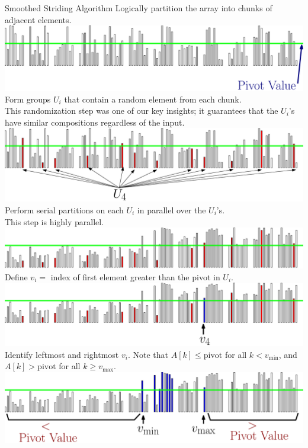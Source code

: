 \documentclass[table,serif,mathserif,final]{beamer}
\theoremstyle{remark}
\begin{document}
\begin{frame}{}
\begin{columns}[t]
  \begin{column}{0.5\linewidth}
\begin{block}{\Huge Smoothed Striding Algorithm}
  \Huge
	Logically partition the array into chunks of adjacent elements.
	\includegraphics[width=\linewidth]{imgs/smoothedStridingAlgSim/sim1.eps}
	Form groups $U_i$ that contain a random element from each chunk. \\
  {\color{blue}This randomization step was one of our key insights; it guarantees that the $U_i$'s have similar compositions regardless of the input.}
	\includegraphics[width=\linewidth]{imgs/smoothedStridingAlgSim/sim2.eps}
	Perform serial partitions on each $U_i$ in parallel over the $U_i$'s. \\
  This step is highly parallel.
	\includegraphics[width=\linewidth]{imgs/smoothedStridingAlgSim/sim3.eps}
  Define $v_i = $ index of first element greater than the pivot in $U_i$. 
	\includegraphics[width=\linewidth]{imgs/smoothedStridingAlgSim/sim35.eps}
  Identify leftmost and rightmost $v_i$. Note that $A[k] \le \text{pivot}$ for all $k < v_{\min}$, and $A[k] > \text{pivot}$ for all $k \ge v_{\max}$.
	\includegraphics[width=\linewidth]{imgs/smoothedStridingAlgSim/sim4.eps}

\end{block}
\end{column}
\end{columns}
\end{frame}
\end{document}
